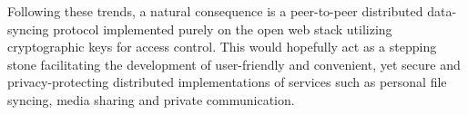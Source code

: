 Following these trends, a natural consequence is a peer-to-peer distributed data-syncing protocol implemented purely on the open web stack utilizing cryptographic keys for access control. This would hopefully act as a stepping stone facilitating the development of user-friendly and convenient, yet secure and privacy-protecting distributed implementations of services such as personal file syncing, media sharing and private communication.

